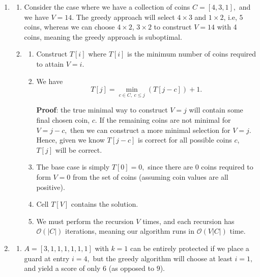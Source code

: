 \documentclass[12pt]{article}
\begin{document}
\begin{enumerate}
  \item
    \begin{enumerate}
      \item Consider the case where we have a collection of coins $C
        = [4, 3, 1],$ and we have $V = 14.$ The greedy approach will
        select $4 \times 3$ and $1 \times 2$, i.e, $5$ coins, whereas
        we can choose $4 \times 2$, $3 \times 2$ to construct $V =
        14$ with 4 coins, meaning the greedy approach is suboptimal.

      \item
        \begin{enumerate}
          \item Construct $T[i]$ where $T[i]$ is the minimum number
            of coins required to attain $V = i.$
          \item We have
            $$
            T[j] = \min_{c \in C, \ c \leq j}(T[j - c]) + 1.
            $$

            \textbf{Proof}: the true minimal way to construct $V = j$
            will contain some final chosen coin, $c.$ If the
            remaining coins are not minimal for $V = j - c,$ then we
            can construct a more minimal selection for $V = j.$
            Hence, given we know $T[j -c ]$ is correct for all
            possible coins $c$, $T[j]$ will be correct.

          \item The base case is simply $T[0] = 0,$ since there are
            $0$ coins required to form $V = 0$ from the set of coins
            (assuming coin values are all positive).

          \item Cell $T[V]$ contains the solution.

          \item We must perform the recursion $V$ times, and each
            recursion has $\mathcal O(|C|)$ iterations, meaning our
            algorithm runs in $\mathcal O(V|C|)$ time.
        \end{enumerate}
    \end{enumerate}

  \item
    \begin{enumerate}
      \item $A = [3, 1, 1, 1, 1, 1, 1]$ with $k = 1$ can be entirely
        protected if we place a guard at entry $i = 4,$ but the
        greedy algorithm will choose at least $i = 1,$ and yield a
        score of only $6$ (as opposed to $9$).


\end{enumerate}
\end{enumerate}
\end{document}
